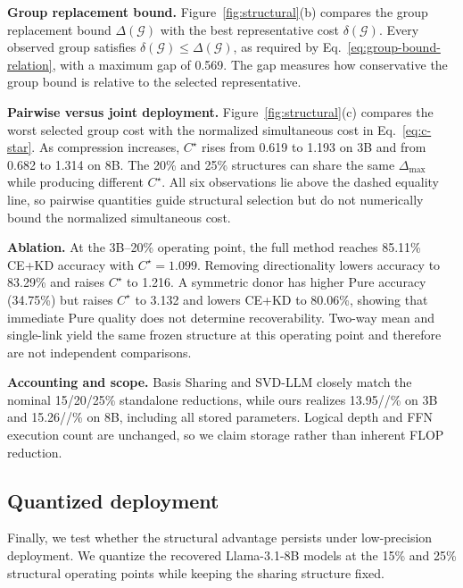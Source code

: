 \documentclass{article}
\begin{document}
\noindent\textbf{Group replacement bound.}
Figure~\ref{fig:structural}(b) compares the group replacement bound
$\Delta(\mathcal G)$ with the best representative cost $\delta(\mathcal G)$.
Every observed group satisfies $\delta(\mathcal G)\leq\Delta(\mathcal G)$,
as required by Eq.~\eqref{eq:group-bound-relation}, with a maximum gap of
0.569. The gap measures how conservative the group bound is relative to the
selected representative.

\noindent\textbf{Pairwise versus joint deployment.}
Figure~\ref{fig:structural}(c) compares the worst selected group cost with the
normalized simultaneous cost in Eq.~\eqref{eq:c-star}. As compression increases,
$C^\star$ rises from 0.619 to 1.193 on 3B and from 0.682 to 1.314 on 8B. The
20\% and 25\% structures can share the same $\Delta_{\max}$ while producing
different $C^\star$. All six observations lie above the dashed equality line,
so pairwise quantities guide structural selection but do not numerically bound
the normalized simultaneous cost.

\noindent\textbf{Ablation.}
At the 3B--20\% operating point, the full method reaches 85.11\% CE+KD accuracy
with $C^\star=1.099$. Removing directionality lowers accuracy to
83.29\% and raises $C^\star$ to 1.216. A symmetric donor has higher
Pure accuracy (34.75\%) but raises $C^\star$ to 3.132 and lowers
CE+KD to 80.06\%, showing that immediate Pure quality does not determine
recoverability. Two-way mean and single-link yield the same frozen structure
at this operating point and therefore are not independent comparisons.

\noindent\textbf{Accounting and scope.}
Basis Sharing and SVD-LLM closely match the nominal 15/20/25\% standalone
reductions, while ours realizes 13.95//\% on 3B and
15.26//\% on 8B, including all stored parameters. Logical depth and
FFN execution count are unchanged, so we claim storage rather than inherent
FLOP reduction.


\subsection{Quantized deployment}
\label{sec:quantized}

Finally, we test whether the structural advantage persists under low-precision
deployment. We quantize the recovered Llama-3.1-8B models at the 15\% and
25\% structural operating points while keeping the sharing structure fixed.
\end{document}

